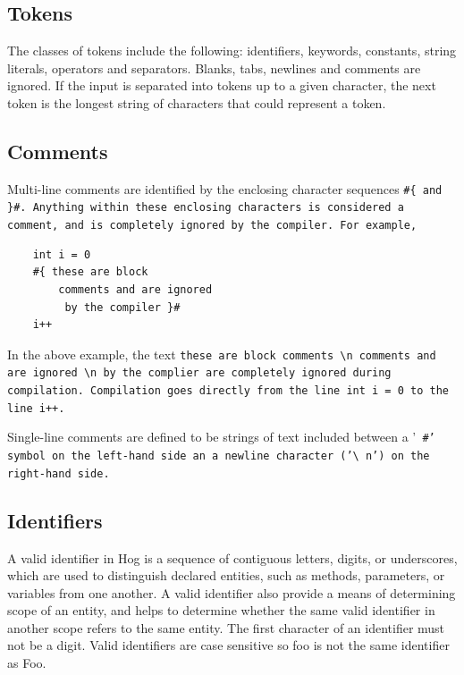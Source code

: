 \documentclass{article}
\begin{document}
\subsection{Tokens} %
\label{sub:tokens}

The classes of tokens include the following: identifiers, keywords,
constants, string literals, operators and separators. Blanks, tabs, newlines and
comments are ignored. If the input is separated into tokens up to a given
character, the next token is the longest string of characters that could represent
a token.


\subsection{Comments} %
\label{sub:comments}

Multi-line comments are identified by the enclosing character sequences \tt \#\{ \rm and \tt \}\#\rm. Anything within these
enclosing characters is considered a comment, and is completely ignored by the compiler. For example,

\begin{verbatim}
    int i = 0
    #{ these are block
        comments and are ignored
         by the compiler }#
    i++
\end{verbatim}

In the above example, the text \tt these are block comments \textbackslash n comments and are ignored \textbackslash n by the
complier \rm are completely ignored during compilation. Compilation goes directly from the line \tt int i = 0 \rm to the line
\tt i++\rm.

Single-line comments are defined to be strings of text included between a '\tt
\#\rm' symbol on the left-hand side an a newline character ('\tt\textbackslash
n\rm') on the right-hand side.


\subsection{Identifiers} %
\label{sub:identifiers}

A valid identifier in Hog is a sequence of contiguous letters, digits, or
underscores, which are used to distinguish declared entities, such as 
methods, parameters, or variables from one another. A valid identifier also
provide a means of determining scope of an entity, and helps to determine whether
the same valid identifier in another scope refers to the same entity. The first
character of an identifier must not be a digit. Valid identifiers are case sensitive
so foo is not the same identifier as Foo.
\end{document}
